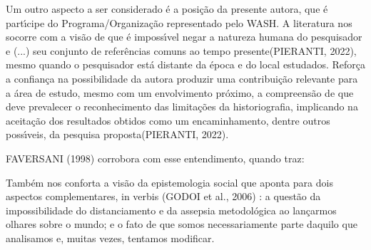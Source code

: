 \documentclass[
12pt,		%
openright,	%
twoside,  %
a4paper,			%
chapter=TITLE,		%
english,			%
french,				%
spanish,			%
brazil				%
]{USPSC-classe/USPSC}
\begin{document}
Um outro aspecto a ser considerado \'e a posi\c{c}\~ao da presente autora, que \'e part\'{\i}cipe do Programa/Organiza\c{c}\~ao representado pelo WASH. A literatura nos socorre com a vis\~ao de que \'e imposs\'{\i}vel \textquotedbl negar a natureza humana do pesquisador e (...) seu conjunto de refer\^encias comuns ao tempo presente\textquotedbl  (PIERANTI, 2022), mesmo quando o pesquisador est\'a \textquotedbl distante da \'epoca e do local estudados\textquotedbl . Refor\c{c}a a confian\c{c}a na possibilidade da autora produzir uma contribui\c{c}\~ao relevante para a \'area de estudo, mesmo com um envolvimento pr\'oximo, a compreens\~ao de que \textquotedbl deve prevalecer o reconhecimento das limita\c{c}\~oes da historiografia, implicando na aceita\c{c}\~ao dos resultados obtidos como um encaminhamento, dentre outros poss\'{\i}veis, da pesquisa proposta\textquotedbl  (PIERANTI, 2022).










 FAVERSANI (1998) corrobora com esse entendimento, quando traz:











\noindent\begin{center}\mbox{\centering{}}\end{center}


Tamb\'em nos conforta a vis\~ao da epistemologia social que aponta para dois aspectos complementares, in verbis  (GODOI et al., 2006) : \textquotedbl a quest\~ao da impossibilidade do distanciamento e da assepsia metodol\'ogica ao lan\c{c}armos olhares sobre o mundo; e o fato de que somos necessariamente parte daquilo que analisamos e, muitas vezes, tentamos modificar\textquotedbl .
\end{document}
